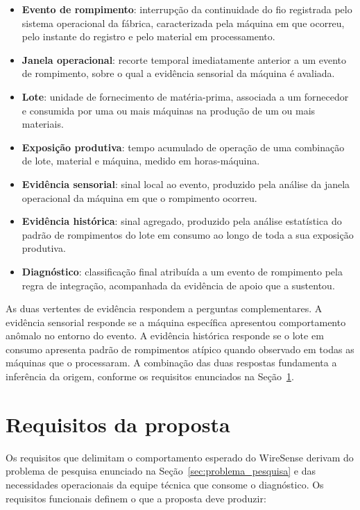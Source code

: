 \begin{itemize}
    \item \textbf{Evento de rompimento}: interrupção da continuidade do fio registrada pelo sistema operacional da fábrica, caracterizada pela máquina em que ocorreu, pelo instante do registro e pelo material em processamento.
    \item \textbf{Janela operacional}: recorte temporal imediatamente anterior a um evento de rompimento, sobre o qual a evidência sensorial da máquina é avaliada.
    \item \textbf{Lote}: unidade de fornecimento de matéria-prima, associada a um fornecedor e consumida por uma ou mais máquinas na produção de um ou mais materiais.
    \item \textbf{Exposição produtiva}: tempo acumulado de operação de uma combinação de lote, material e máquina, medido em horas-máquina.
    \item \textbf{Evidência sensorial}: sinal local ao evento, produzido pela análise da janela operacional da máquina em que o rompimento ocorreu.
    \item \textbf{Evidência histórica}: sinal agregado, produzido pela análise estatística do padrão de rompimentos do lote em consumo ao longo de toda a sua exposição produtiva.
    \item \textbf{Diagnóstico}: classificação final atribuída a um evento de rompimento pela regra de integração, acompanhada da evidência de apoio que a sustentou.
\end{itemize}

As duas vertentes de evidência respondem a perguntas complementares. A evidência sensorial responde se a máquina específica apresentou comportamento anômalo no entorno do evento. A evidência histórica responde se o lote em consumo apresenta padrão de rompimentos atípico quando observado em todas as máquinas que o processaram. A combinação das duas respostas fundamenta a inferência da origem, conforme os requisitos enunciados na Seção~\ref{sec:requisitos}.


\section{Requisitos da proposta}
\label{sec:requisitos}

Os requisitos que delimitam o comportamento esperado do WireSense derivam do problema de pesquisa enunciado na Seção~\ref{sec:problema_pesquisa} e das necessidades operacionais da equipe técnica que consome o diagnóstico. Os requisitos funcionais definem o que a proposta deve produzir:

